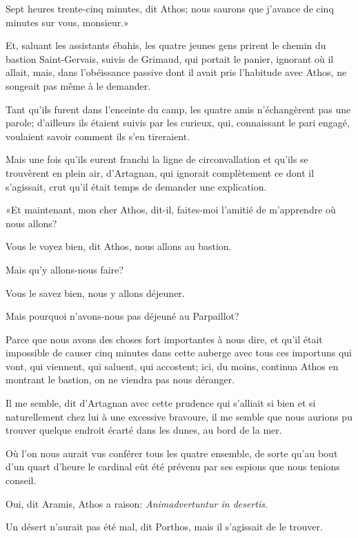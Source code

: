 \speak  Sept heures trente-cinq minutes, dit Athos; nous saurons que j'avance de cinq minutes sur vous, monsieur.» 

Et, saluant les assistants ébahis, les quatre jeunes gens prirent le chemin du bastion Saint-Gervais, suivis de Grimaud, qui portait le panier, ignorant où il allait, mais, dans l'obéissance passive dont il avait pris l'habitude avec Athos, ne songeait pas même à le demander. 

Tant qu'ils furent dans l'enceinte du camp, les quatre amis n'échangèrent pas une parole; d'ailleurs ils étaient suivis par les curieux, qui, connaissant le pari engagé, voulaient savoir comment ils s'en tireraient. 

Mais une fois qu'ils eurent franchi la ligne de circonvallation et qu'ils se trouvèrent en plein air, d'Artagnan, qui ignorait complètement ce dont il s'agissait, crut qu'il était temps de demander une explication. 

«Et maintenant, mon cher Athos, dit-il, faites-moi l'amitié de m'apprendre où nous allons? 

\speak  Vous le voyez bien, dit Athos, nous allons au bastion. 

\speak  Mais qu'y allons-nous faire? 

\speak  Vous le savez bien, nous y allons déjeuner. 

\speak  Mais pourquoi n'avons-nous pas déjeuné au Parpaillot? 

\speak  Parce que nous avons des choses fort importantes à nous dire, et qu'il était impossible de causer cinq minutes dans cette auberge avec tous ces importuns qui vont, qui viennent, qui saluent, qui accostent; ici, du moins, continua Athos en montrant le bastion, on ne viendra pas nous déranger. 

\speak  Il me semble, dit d'Artagnan avec cette prudence qui s'alliait si bien et si naturellement chez lui à une excessive bravoure, il me semble que nous aurions pu trouver quelque endroit écarté dans les dunes, au bord de la mer. 

\speak  Où l'on nous aurait vus conférer tous les quatre ensemble, de sorte qu'au bout d'un quart d'heure le cardinal eût été prévenu par ses espions que nous tenions conseil. 

Oui, dit Aramis, Athos a raison: \textit{Animadvertuntur in desertis}. 

Un désert n'aurait pas été mal, dit Porthos, mais il s'agissait de le trouver. 

